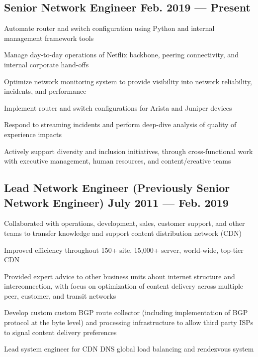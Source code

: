 \documentclass[letter,10pt]{article}
\begin{document}
\subsection{Senior Network Engineer \hfill Feb. 2019 --- Present}
\begin{zitemize}
	\item Automate router and switch configuration using Python and
	internal management framework tools
	\item Manage day-to-day operations of Netflix backbone, peering
	connectivity, and internal corporate hand-offs
	\item Optimize network monitoring system to provide visibility
	into network reliability, incidents, and performance
	\item Implement router and switch configurations for Arista and
	Juniper devices
	\item Respond to streaming incidents and perform deep-dive
	analysis of quality of experience impacts
	\item Actively support diversity and inclusion initiatives,
	through cross-functional work with executive management,
	human resources, and content/creative teams
\end{zitemize}


\subsection{Lead Network Engineer (Previously Senior Network Engineer) \hfill July 2011 --- Feb. 2019}
\begin{zitemize}
	\item Collaborated with operations, development, sales, customer support,
	and other teams to transfer knowledge and support content
	distribution network (CDN)
	\item Improved efficiency throughout 150+ site, 15,000+ server,
	world-wide, top-tier CDN
	\item Provided expert advice to other business units about internet
	structure and interconnection, with focus on optimization of content delivery across
	multiple peer, customer, and transit networks
	\item Develop custom custom BGP route collector (including
	implementation of BGP protocol at the byte level) and processing infrastructure
	to allow third party ISPs to signal content delivery preferences
	\item Lead system engineer for CDN DNS global load balancing and
	rendezvous system
\end{zitemize}
\end{document}
